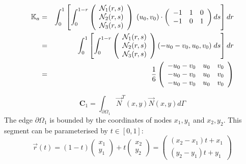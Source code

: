\begin{eqnarray}
{\mathbb{K}}_a 
&=& 
\int_0^{1} \left[ \int_0^{1-r}
\left(
\begin{array}{c}
{\mathcal{N}}_1(r,s) \\
{\mathcal{N}}_2(r,s) \\
{\mathcal{N}}_3(r,s) 
\end{array}
\right)
\;
(u_0,v_0)
\cdot
\left(
\begin{array}{ccc}
-1 & 1 & 0 \\
-1 & 0 & 1
\end{array}
\right) ds \right] dr  \nonumber\\
&=&
\int_0^{1} \left[ \int_0^{1-r}
\left(
\begin{array}{c}
{\mathcal{N}}_1(r,s) \\
{\mathcal{N}}_2(r,s) \\
{\mathcal{N}}_3(r,s) 
\end{array}
\right)
(-u_0-v_0 , u_0 , v_0) \;
ds \right] dr \nonumber\\
&=& \frac16
\left(
\begin{array}{ccc}
-u_0 - v_0   & u_0   &  v_0   \\
-u_0 - v_0   & u_0   &  v_0   \\
-u_0 - v_0   & u_0   &  v_0   
\end{array}
\right)
\end{eqnarray}















\newpage
\[
{\bm C}_1
=\int_{\partial\Omega_1} \vec{N}^T(x,y) \vec{N}(x,y) d\Gamma
\]
The edge $\partial\Omega_1$ is bounded by the coordinates of nodes $x_1,y_1$
and $x_2,y_2$. This segment can be parameterised by $t\in[0,1]$:
\[
\vec{r}(t) = (1-t)\left(\begin{array}{c} x_1 \\ y_1 \end{array} \right) + 
t \left(\begin{array}{c} x_2 \\ y_2 \end{array} \right)
=
\left(\begin{array}{c} (x_2-x_1)t +x_1 \\ (y_2-y_1)t+y_1 \end{array} \right) 
\]

